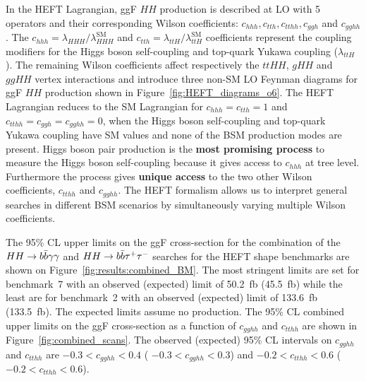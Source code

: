 \documentclass[twoside,11pt]{report}
\newcommand*{\Fig}[1]{Figure~#1\xspace}
\newcommand*{\hhtobbyy}{\ensuremath{\HH\rightarrow\bbyy}\xspace}
\newcommand*{\hhtobbtt}{\ensuremath{\HH\rightarrow\bbtautau}\xspace}
\newcommand*{\cgghh}{\ensuremath{c_{gghh}}\xspace}
\newcommand*{\ctthh}{\ensuremath{c_{tthh}}\xspace}
\begin{document}
In the HEFT Lagrangian, ggF $HH$ production is described at LO with 
5 operators and their corresponding Wilson coefficients: $c_{hhh}, c_{tth}, c_{tthh}, c_{ggh}$ 
and $c_{gghh}$. The $c_{hhh} = \lambda_{HHH} / \lambda^{\text{SM}}_{HHH}$ and 
$c_{tth} = \lambda_{ttH} / \lambda^{\text{SM}}_{ttH}$ coefficients 
represent the coupling modifiers for the Higgs boson self-coupling and top-quark 
Yukawa coupling ($\lambda_{ttH}$). The remaining Wilson coefficients affect respectively 
the $ttHH$, $gHH$ and $ggHH$ vertex interactions and introduce three non-SM LO Feynman 
diagrams for ggF $HH$ production shown in Figure~\ref{fig:HEFT_diagrams_o6}.
The HEFT Lagrangian reduces to the SM Lagrangian for $c_{hhh} = c_{tth} = 1$ 
and $c_{tthh} = c_{ggh} = c_{gghh} = 0$, when the Higgs boson self-coupling 
and top-quark Yukawa coupling have SM values and none of the BSM production modes are present. 
Higgs boson pair production is the \textbf{most promising process} to measure the 
Higgs boson self-coupling because it gives access to $c_{hhh}$ at tree level.
Furthermore the \HH process gives \textbf{unique access} to 
the two other Wilson coefficients, $c_{tthh}$ and $c_{gghh}$.
The HEFT formalism allows us to interpret general searches in different BSM scenarios 
by simultaneously varying multiple Wilson coefficients. 


The 95\% CL upper limits on the ggF \HH cross-section for the combination 
of the \hhtobbyy and \hhtobbtt searches for the HEFT shape benchmarks are shown 
on \Fig{\ref{fig:results:combined_BM}}.
The most stringent limits are set for benchmark~7 with an observed (expected) 
limit of 50.2~fb (45.5~fb) while the least are for benchmark~2 
with an observed (expected) limit of \SI{133.6}{fb} (\SI{133.5}{fb}).
The expected limits assume no \HH production.
The 95\% CL combined upper limits on the ggF \HH cross-section as a 
function of \cgghh and \ctthh are shown in \Fig{\ref{fig:combined_scans}}. 
The observed (expected) 95\% CL intervals on $\cgghh$ and $\ctthh$ are 
$-0.3 < \cgghh  < 0.4$ ( $-0.3 < \cgghh  < 0.3$) and $-0.2 < \ctthh < 0.6$ ( $-0.2 < \ctthh < 0.6$).
\newline
\end{document}
